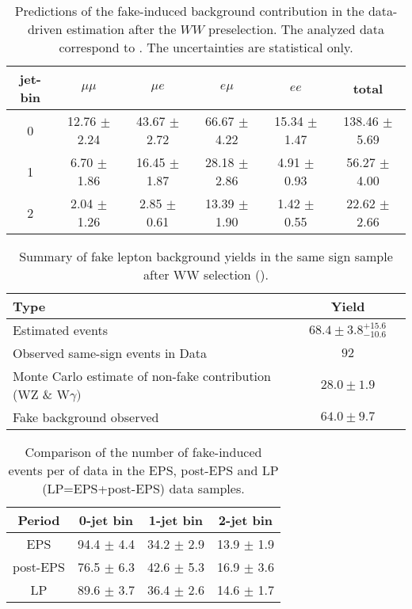 \begin{table}[!htbp]
\begin{center}
\begin{tabular}{c c c c c c} 
\hline
jet-bin &	 $\mu\mu$ &	 $\mu e$ &	 $e\mu$ &	 $ee$ &	 total \\ 
\hline
0 &	 12.76 $\pm$ 2.24 &	 43.67 $\pm$ 2.72 &	 66.67 $\pm$ 4.22 &	 15.34 $\pm$ 1.47 &	 138.46 $\pm$ 5.69 \\
1 &	 6.70 $\pm$ 1.86  &      16.45 $\pm$ 1.87 &      28.18 $\pm$ 2.86 &       4.91 $\pm$ 0.93 &       56.27 $\pm$ 4.00 \\
2 &	 2.04 $\pm$ 1.26  &       2.85 $\pm$ 0.61 &      13.39 $\pm$ 1.90 &       1.42 $\pm$ 0.55 &       22.62 $\pm$ 2.66 \\
\hline
\end{tabular}
\caption{Predictions of the fake-induced background contribution 
in the data-driven estimation after the $WW$ preselection. 
The analyzed data correspond to \lpintlumi.
The uncertainties are statistical only.}
\label{tab:lp_fake_est}
\end{center}
\end{table}

\begin{table}[!htbp]
\begin{center}
\begin{tabular}{|l|c|c|}
\hline
Type                                                             & Yield \\
\hline
Estimated events                                                 &  $68.4\pm3.8^{+15.6}_{-10.6}$  \\
\hline
Observed same-sign events in Data                                &  $92$        \\
Monte Carlo estimate of non-fake contribution (WZ \& W$\gamma)$  & $28.0\pm1.9$ \\
Fake background observed                                         & $64.0\pm9.7$ \\
\hline
\end{tabular}
\caption{Summary of fake lepton background yields in the same sign sample after WW selection (\lpintlumi). }
\label{tab:lp_FakeLeptonBkgPrediction_SameSignSample}
\end{center}
\end{table}

\begin{table}[!htbp]
\begin{center}
\begin{tabular}{c c c c} 
\hline
Period & 0-jet bin & 1-jet bin & 2-jet bin \\ 
\hline
EPS      & 94.4 $\pm$ 4.4 & 34.2 $\pm$ 2.9 & 13.9 $\pm$ 1.9 \\
post-EPS & 76.5 $\pm$ 6.3 & 42.6 $\pm$ 5.3 & 16.9 $\pm$ 3.6 \\
LP       & 89.6 $\pm$ 3.7 & 36.4 $\pm$ 2.6 & 14.6 $\pm$ 1.7 \\
\hline
\end{tabular}
\caption{Comparison of the number of fake-induced events per \ifb of data in the EPS, post-EPS and LP (LP=EPS+post-EPS) data samples.}
\label{tab:lp_periods_fake}
\end{center}
\end{table}

